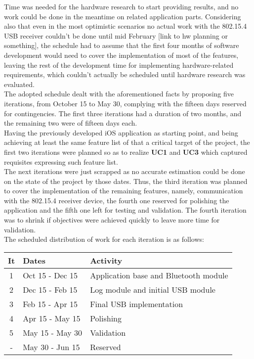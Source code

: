 			Time was needed for the hardware research to start providing results, and no work could be done in the meantime on related application parts. Considering also that even in the most optimistic scenarios no actual work with the 802.15.4 USB receiver couldn't be done until mid February [link to hw planning or something], the schedule had to assume that the first four months of software development would need to cover the implementation of most of the features, leaving the rest of the development time for implementing hardware-related requirements, which couldn't actually be scheduled until hardware research was evaluated.\\

			The adopted schedule dealt with the aforementioned facts by proposing five iterations, from October 15 to May 30, complying with the fifteen days reserved for contingencies. The first three iterations had a duration of two months, and the remaining two were of fifteen days each.\\

			Having the previously developed iOS application as starting point, and being achieving at least the same feature list of that a critical target of the project, the first two iterations were planned so as to realize \textbf{UC1} and \textbf{UC3} which captured requisites expressing such feature list.\\

			The next iterations were just scrapped as no accurate estimation could be done on the state of the project by those dates. Thus, the third iteration was planned to cover the implementation of the remaining features, namely, communication with the 802.15.4 receiver device, the fourth one reserved for polishing the application and the fifth one left for testing and validation. The fourth iteration was to shrink if objectives were achieved quickly to leave more time for validation.\\

			The scheduled distribution of work for each iteration is as follows:\\

			\begin{tabular}{| c | l | l |} %
				\hline
				It & Dates & Activity \\ \hline
				1 & Oct 15 - Dec 15 & Application base and Bluetooth module\\ \hline
				2 & Dec 15 - Feb 15 & Log module and initial USB module\\ \hline
				3 & Feb 15 - Apr 15 & Final USB implementation \\ \hline
				4 & Apr 15 - May 15 & Polishing \\ \hline
				5 & May 15 - May 30 & Validation \\ \hline
				- & May 30 - Jun 15 & Reserved \\
				\hline
			\end{tabular}\\

